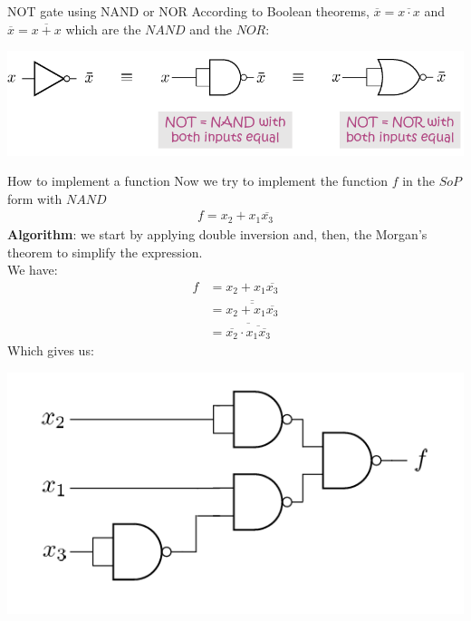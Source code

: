 \begin{parag}{NOT gate using NAND or NOR}
        According to Boolean theorems, $ \overline{x} = \overline{x \cdot x}$ and $ \overline{x} = \overline{x + x}$ which are the $NAND$ and the $NOR$:
\begin{center}
    \includegraphics[scale=0.6]{notgatenandnor2025-03-10.png}
\end{center}
\begin{subparag}{How to implement a function}
    Now we try to implement the function $f$ in the $SoP$ form with $NAND$
    \begin{align*}
        f = x_2 + x_1 \overline{x_3}
    \end{align*}
    \textbf{Algorithm}: we start by applying double inversion and, then, the Morgan's theorem to simplify the expression.
    \\
    We have:
    \begin{align*}
        f &= x_2 + x_1 \overline{x_3} \\
          &= \overline{ \overline{ x_2 + x_1 \overline{x_3}}} \\
          &= \overline{ \overline{x_2} \cdot \overline{ x_1 \overline{ x_3}}}
    \end{align*}
    Which gives us:
    \begin{center}
        \includegraphics[scale=0.6]{gate22025-03-10.png}
    \end{center}
\end{subparag}

\end{parag}

